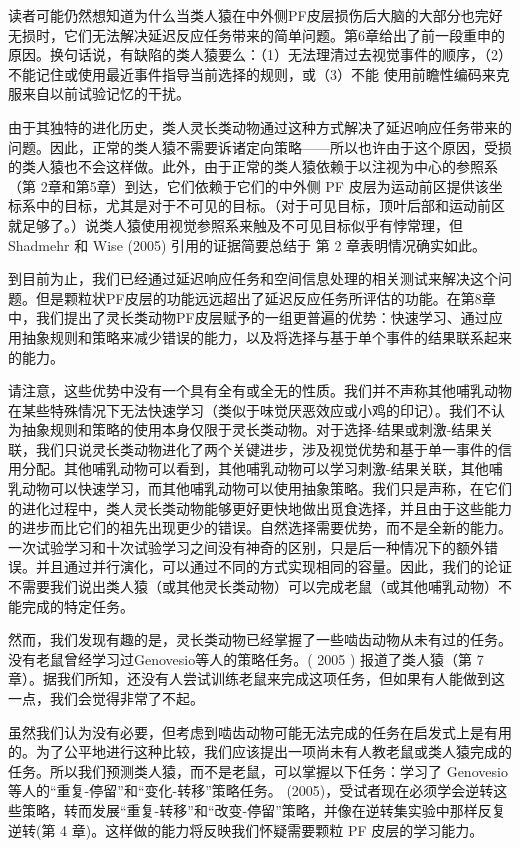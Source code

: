 \par 
读者可能仍然想知道为什么当类人猿在中外侧PF皮层损伤后大脑的大部分也完好无损时，它们无法解决延迟反应任务带来的简单问题。第6章给出了前一段重申的原因。换句话说，有缺陷的类人猿要么：（1）无法理清过去视觉事件的顺序，（2）不能记住或使用最近事件指导当前选择的规则，或（3）不能 使用前瞻性编码来克服来自以前试验记忆的干扰。
\par 
由于其独特的进化历史，类人灵长类动物通过这种方式解决了延迟响应任务带来的问题。因此，正常的类人猿不需要诉诸定向策略——所以也许由于这个原因，受损的类人猿也不会这样做。此外，由于正常的类人猿依赖于以注视为中心的参照系（第 2章和第5章）到达，它们依赖于它们的中外侧 PF 皮层为运动前区提供该坐标系中的目标，尤其是对于不可见的目标。（对于可见目标，顶叶后部和运动前区就足够了。）说类人猿使用视觉参照系来触及不可见目标似乎有悖常理，但 Shadmehr 和 Wise (2005) 引用的证据简要总结于 第 2 章表明情况确实如此。
\par 
到目前为止，我们已经通过延迟响应任务和空间信息处理的相关测试来解决这个问题。但是颗粒状PF皮层的功能远远超出了延迟反应任务所评估的功能。在第8章中，我们提出了灵长类动物PF皮层赋予的一组更普遍的优势：快速学习、通过应用抽象规则和策略来减少错误的能力，以及将选择与基于单个事件的结果联系起来的能力。
\par 
请注意，这些优势中没有一个具有全有或全无的性质。我们并不声称其他哺乳动物在某些特殊情况下无法快速学习（类似于味觉厌恶效应或小鸡的印记）。我们不认为抽象规则和策略的使用本身仅限于灵长类动物。对于选择-结果或刺激-结果关联，我们只说灵长类动物进化了两个关键进步，涉及视觉优势和基于单一事件的信用分配。其他哺乳动物可以看到，其他哺乳动物可以学习刺激-结果关联，其他哺乳动物可以快速学习，而其他哺乳动物可以使用抽象策略。我们只是声称，在它们的进化过程中，类人灵长类动物能够更好更快地做出觅食选择，并且由于这些能力的进步而比它们的祖先出现更少的错误。自然选择需要优势，而不是全新的能力。一次试验学习和十次试验学习之间没有神奇的区别，只是后一种情况下的额外错误。并且通过并行演化，可以通过不同的方式实现相同的容量。因此，我们的论证不需要我们说出类人猿（或其他灵长类动物）可以完成老鼠（或其他哺乳动物）不能完成的特定任务。
\par 
然而，我们发现有趣的是，灵长类动物已经掌握了一些啮齿动物从未有过的任务。没有老鼠曾经学习过Genovesio等人的策略任务。( 2005 ) 报道了类人猿（第 7 章）。据我们所知，还没有人尝试训练老鼠来完成这项任务，但如果有人能做到这一点，我们会觉得非常了不起。
\par 
虽然我们认为没有必要，但考虑到啮齿动物可能无法完成的任务在启发式上是有用的。为了公平地进行这种比较，我们应该提出一项尚未有人教老鼠或类人猿完成的任务。所以我们预测类人猿，而不是老鼠，可以掌握以下任务：学习了 Genovesio等人的“重复-停留”和“变化-转移”策略任务。 (2005)，受试者现在必须学会逆转这些策略，转而发展“重复-转移”和“改变-停留”策略，并像在逆转集实验中那样反复逆转(第 4 章)。这样做的能力将反映我们怀疑需要颗粒 PF 皮层的学习能力。
